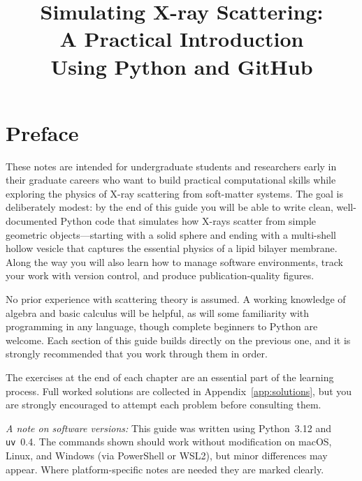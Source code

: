 \documentclass[nobib]{tufte-book}
\title{Simulating X-ray Scattering:\\[6pt]
       A Practical Introduction\\[6pt]
       Using Python and GitHub}
\author{}
\date{}
\begin{document}

\maketitle
\tableofcontents

\chapter*{Preface}

These notes are intended for undergraduate students and researchers early in
their graduate careers who want to build practical computational skills while
exploring the physics of X-ray scattering from soft-matter systems.
The goal is deliberately modest: by the end of this guide you will be able
to write clean, well-documented Python code that simulates how X-rays scatter
from simple geometric objects---starting with a solid sphere and ending with a
multi-shell hollow vesicle that captures the essential physics of a lipid
bilayer membrane.
Along the way you will also learn how to manage software environments, track
your work with version control, and produce publication-quality figures.

No prior experience with scattering theory is assumed.
A working knowledge of algebra and basic calculus will be helpful, as will some
familiarity with programming in any language, though complete beginners to Python
are welcome.
Each section of this guide builds directly on the previous one, and it is
strongly recommended that you work through them in order.

The exercises at the end of each chapter are an essential part of the learning
process.
Full worked solutions are collected in Appendix~\ref{app:solutions}, but you
are strongly encouraged to attempt each problem before consulting them.

\bigskip
\noindent\textit{A note on software versions:}
This guide was written using Python~3.12 and \texttt{uv}~0.4.
The commands shown should work without modification on macOS, Linux, and
Windows (via PowerShell or WSL2), but minor differences may appear.
Where platform-specific notes are needed they are marked clearly.

\end{document}
